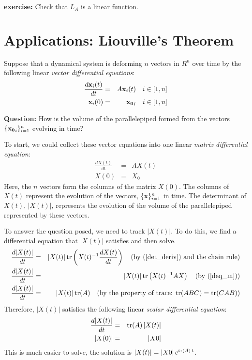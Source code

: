 \documentclass{article}
\begin{document}
{\bf exercise:} Check that $L_A$ is a linear function.

\section{Applications: Liouville's Theorem}
Suppose that a dynamical system is deforming $n$ vectors in $R^n$ over time by
the following linear {\em vector differential equations\/}:
\begin{eqnarray}
  \frac{d {\bf x}_i(t)}{dt} & = & A {\bf x}_i(t) \quad i \in [1, n] \label{deq_v}\\
    {\bf x}_i(0) & = & {\bf x_0}_i \quad i \in [1,n]
\end{eqnarray}

{\bf Question:\/} How is the volume of the parallelepiped formed from the vectors $\{{\bf x_0}_i\}_{i=1}^n$ 
evolving in time?

To start, we could collect these vector equations into one linear
{\em matrix differential equation\/}:
\begin{eqnarray}
  \frac{d X(t)}{dt} & = & A X(t) \label{deq_m}\\
  X(0) & = & X_0
\end{eqnarray}
Here, the $n$ vectors form the columns of the matrix $X(0)$. The columns of
$X(t)$ represent the evolution of the vectors, $\{{\bf x}\}_{i=1}^n$ in time.
The determinant of $X(t)$, $|X(t)|$, represents the evolution of the volume 
of the parallelepiped represented by these vectors.

To answer the question posed, 
we need to track $|X(t)|$. To do this, we find a differential equation
that $|X(t)|$ satisfies and then solve.
\begin{eqnarray*}
  \frac{d |X(t)|}{dt} & = & |X(t)| \, {\rm tr}\left(X(t)^{-1} \frac{d X(t)}{dt}\right)
  \quad \text{(by $(\ref{det_deriv})$ and the chain rule)} \\
  \frac{d |X(t)|}{dt} & = & |X(t)| \, {\rm tr}\left(X(t)^{-1} A X\right) \quad
  \text{(by $(\ref{deq_m})$)} \\
  \frac{d |X(t)|}{dt} & = & |X(t)| \, {\rm tr}(A) \quad
  \text{(by the property of trace: ${\rm tr}(ABC) = {\rm tr}(CAB)$)}
\end{eqnarray*}
Therefore, $|X(t)|$ satisfies the following linear {\em scalar differential equation\/}:
\begin{eqnarray}
  \frac{d |X(t)|}{dt} & = & {\rm tr}(A) \, |X(t)| \\
  |X(0)| & = & |X0|
\end{eqnarray}
This is much easier to solve, the solution is $|X(t)| = |X0| \, e^{{\rm tr}(A)\, t}$.
\end{document}
